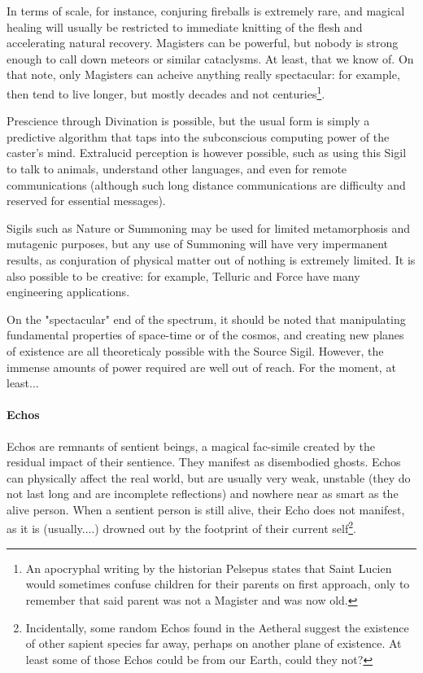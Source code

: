 In terms of scale, for instance, conjuring fireballs is extremely rare, and magical healing will usually be restricted to immediate knitting of the flesh and accelerating natural recovery. Magisters can be powerful, but nobody is strong enough to call down meteors or similar cataclysms. At least, that we know of. On that note, only Magisters can acheive anything really spectacular: for example, then tend to live longer, but mostly decades and not centuries\footnote{An apocryphal writing by the historian Pelsepus states that Saint Lucien would sometimes confuse children for their parents on first approach, only to remember that said parent was not a Magister and was now old.}.

Prescience through Divination is possible, but the usual form is simply a predictive algorithm that taps into the subconscious computing power of the caster's mind. Extralucid perception is however possible, such as using this Sigil to talk to animals, understand other languages, and even for remote communications (although such long distance communications are difficulty and reserved for essential messages).

Sigils such as Nature or Summoning may be used for limited metamorphosis and mutagenic purposes, but any use of Summoning will have very impermanent results, as conjuration of physical matter out of nothing is extremely limited. It is also possible to be creative: for example, Telluric and Force have many engineering applications.

On the "spectacular" end of the spectrum, it should be noted that manipulating fundamental properties of space-time or of the cosmos, and creating new planes of existence are all theoreticaly possible with the Source Sigil. However, the immense amounts of power required are well out of reach. For the moment, at least...

\paragraph{Echos}

Echos are remnants of sentient beings, a magical fac-simile created by the residual impact of their sentience. They manifest as disembodied ghosts. Echos can physically affect the real world, but are usually very weak, unstable (they do not last long and are incomplete reflections) and nowhere near as smart as the alive person. When a sentient person is still alive, their Echo does not manifest, as it is (usually....) drowned out by the footprint of their current self\footnote{Incidentally, some random Echos found in the Aetheral suggest the existence of other sapient species far away, perhaps on another plane of existence. At least some of those Echos could be from our Earth, could they not?}.

